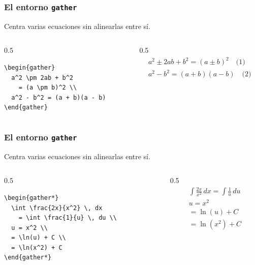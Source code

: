 \documentclass[12pt,aspectratio=169,ignorenonframetext]{ltxbeamer}
\begin{document}
\begin{frame}[fragile]
\frametitle{El entorno \texttt{gather}}
Centra varias ecuaciones sin alinearlas entre sí.

\begin{columns}
    \begin{column}{0.5\textwidth}
        \begin{verbatim}
\begin{gather}
  a^2 \pm 2ab + b^2
    = (a \pm b)^2 \\
  a^2 - b^2 = (a + b)(a - b)
\end{gather}
        \end{verbatim}
    \end{column}
    {\color{gray} \vline}
    \begin{column}{0.5\textwidth}
        \lmr
        \begin{displaymath}
            \begin{gathered}
                a^2 \pm 2ab + b^2 = (a \pm b)^2 \quad \text{(1)} \\
                a^2 - b^2 = (a + b)(a - b) \quad \text{(2)}
            \end{gathered}
        \end{displaymath}
    \end{column}
\end{columns}
\end{frame}





\begin{frame}[fragile]
\frametitle{El entorno \texttt{gather}}
Centra varias ecuaciones sin alinearlas entre sí.

\begin{columns}
    \begin{column}{0.5\textwidth}
        \begin{verbatim}
\begin{gather*}
  \int \frac{2x}{x^2} \, dx
    = \int \frac{1}{u} \, du \\
  u = x^2 \\
  = \ln(u) + C \\
  = \ln(x^2) + C
\end{gather*}
        \end{verbatim}
    \end{column}
    {\color{gray} \vline}
    \begin{column}{0.5\textwidth}
        \begin{displaymath}
            \begin{gathered}
                \int \frac{2x}{x^2} \, dx
                    = \int \frac{1}{u} \, du \\
                u = x^2 \\
                = \ln(u) + C \\
                = \ln(x^2) + C
            \end{gathered}
        \end{displaymath}
    \end{column}
\end{columns}
\end{frame}
\end{document}
